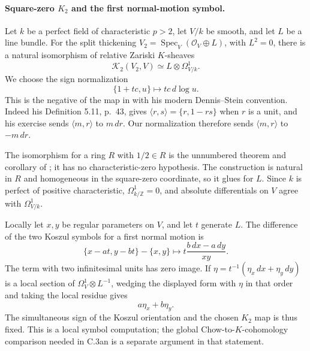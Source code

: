 \paragraph{Square-zero $K_2$ and the first normal-motion symbol.}
Let $k$ be a perfect field of characteristic $p>2$, let $V/k$ be smooth,
and let $L$ be a line bundle. For the split thickening
$V_2=\operatorname{Spec}_V(\mathcal O_V\oplus L)$, with $L^2=0$,
there is a natural isomorphism of relative Zariski $K$-sheaves
\[
 \mathcal K_2(V_2,V)\simeq L\otimes\Omega^1_{V/k}.
\]
We choose the sign normalization
\[
              \{1+tc,u\}\longmapsto tc\,d\log u.
\]
This is the negative of the map in
\citet[Chapter III, Exercise 5.14, pp.~46--47]{frWeibelKbookIII}
with his modern Dennis--Stein convention. Indeed his Definition 5.11,
p.~43, gives $\langle r,s\rangle=\{r,1-rs\}$ when $r$ is a unit,
and his exercise sends $\langle m,r\rangle$ to $m\,dr$.
Our normalization therefore sends $\langle m,r\rangle$ to $-m\,dr$.

The isomorphism for a ring $R$ with $1/2\in R$ is the unnumbered
theorem and corollary of \citet[p.~A1204, proof pp.~A1205--A1207]
{frVanDerKallen1971}; it has no characteristic-zero hypothesis.
The construction is natural in $R$ and homogeneous in the square-zero
coordinate, so it glues for $L$. Since $k$ is perfect of positive
characteristic, $\Omega^1_{k/\mathbb Z}=0$, and absolute differentials
on $V$ agree with $\Omega^1_{V/k}$.

Locally let $x,y$ be regular parameters on $V$, and let $t$ generate
$L$. The difference of the two Koszul symbols for a first normal motion
is
\[
 \{x-at,y-bt\}-\{x,y\}
       \longmapsto t\frac{b\,dx-a\,dy}{xy}.
\]
The term with two infinitesimal units has zero image. If
$\eta=t^{-1}(\eta_x\,dx+\eta_y\,dy)$ is a local section of
$\Omega^1_V\otimes L^{-1}$, wedging the displayed form with $\eta$
in that order and taking the local residue gives
\[
                              a\eta_x+b\eta_y.
\]
The simultaneous sign of the Koszul orientation and the chosen
$K_2$ map is thus fixed. This is a local symbol computation; the
global Chow-to-$K$-cohomology comparison needed in C.3an is a separate
argument in that statement.
